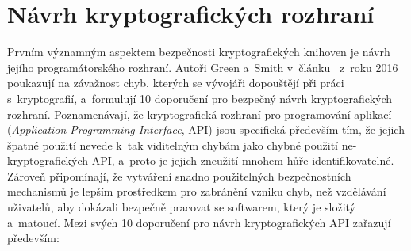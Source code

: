 \section{Návrh kryptografických rozhraní}

Prvním významným aspektem bezpečnosti kryptografických knihoven je návrh jejího pro\-g\-ra\-má\-tor\-ského rozhraní. Autoři Green a~Smith v~článku~\cite{greensmith} z~roku 2016 poukazují na závažnost chyb, kterých se vývojáři dopouštějí při práci s~kryptografií, a~formulují 10 doporučení pro bezpečný návrh kryptografických rozhraní. Poznamenávají, že kryptografická rozhraní pro programování aplikací (\emph{Application Programming Interface}, API) jsou specifická především tím, že jejich špatné použití nevede k~tak viditelným chybám jako chybné použití ne-kryptografických API, a~proto je jejich zneužití mnohem hůře identifikovatelné. Zároveň připomínají, že vytváření snadno použitelných bezpečnostních mechanismů je lepším prostředkem pro zabránění vzniku chyb, než vzdělávání uživatelů, aby dokázali bezpečně pracovat se softwarem, který je složitý a~matoucí. Mezi svých 10 doporučení pro návrh kryptografických API zařazují především:

